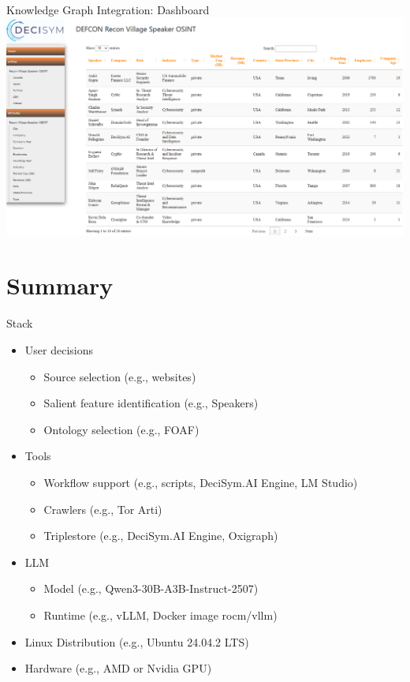 \documentclass[pdf,aspectratio=169]{beamer}
\begin{document}
\begin{frame}{Knowledge Graph Integration: Dashboard}
  \centering
  \includegraphics[height=0.75\textheight]{automaton_snapshot_2025-08-06.png}
\end{frame}

\section{Summary}

\begin{frame}{Stack}
  \begin{itemize}
  \item User decisions
    \begin{itemize}
    \item Source selection (e.g., websites)
    \item Salient feature identification (e.g., Speakers)
    \item Ontology selection (e.g., FOAF)
    \end{itemize}
  \item Tools
    \begin{itemize}
    \item Workflow support (e.g., scripts, DeciSym.AI Engine, LM Studio)
    \item Crawlers (e.g., Tor Arti)
    \item Triplestore (e.g., DeciSym.AI Engine, Oxigraph)
    \end{itemize}
  \item LLM
    \begin{itemize}
    \item Model (e.g., Qwen3-30B-A3B-Instruct-2507)
    \item Runtime (e.g., vLLM, Docker image rocm/vllm)
    \end{itemize}
  \item Linux Distribution (e.g., Ubuntu 24.04.2 LTS)
  \item Hardware (e.g., AMD or Nvidia GPU)
  \end{itemize}
\end{frame}
\end{document}
